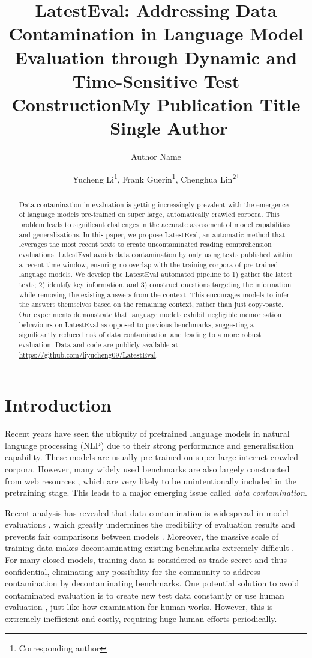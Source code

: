 \documentclass[letterpaper]{article} %
\title{LatestEval: Addressing Data Contamination in Language Model Evaluation through Dynamic and Time-Sensitive Test Construction}
\title{My Publication Title --- Single Author}
\author {
    Author Name
}
\author {
    Yucheng Li\textsuperscript{\rm 1},
    Frank Guerin\textsuperscript{\rm 1},
    Chenghua Lin\textsuperscript{\rm 2}\thanks{Corresponding author}
}
\begin{document}
\maketitle

\begin{abstract}
Data contamination in evaluation is getting increasingly prevalent with the emergence of language models pre-trained on super large, automatically crawled corpora. This problem leads to significant challenges in the accurate assessment of model capabilities and generalisations. In this paper, we propose LatestEval, an automatic method that leverages the most recent texts to create uncontaminated reading comprehension evaluations. LatestEval avoids data contamination by only using texts published within a recent time window, ensuring no overlap with the training corpora of pre-trained language models. We develop the LatestEval automated pipeline to 1) gather the latest texts; 2) identify key information, and 3) construct questions targeting the information while removing the existing answers from the context. This encourages models to infer the answers themselves based on the remaining context, rather than just copy-paste. Our experiments demonstrate that language models exhibit negligible memorisation behaviours on LatestEval as opposed to previous benchmarks, suggesting a significantly reduced risk of data contamination and leading to a more robust evaluation. Data and code are publicly available at: \url{https://github.com/liyucheng09/LatestEval}.
\end{abstract}

\section{Introduction}

Recent years have seen the ubiquity of pretrained language models in natural language processing (NLP) due to their strong performance and generalisation capability. These models are usually pre-trained on super large internet-crawled corpora. However, many widely used benchmarks are also largely constructed from web resources \cite{hendrycks2021measuring}, which are very likely to be unintentionally included in the pretraining stage. This leads to a major emerging issue called \textit{data contamination}.

Recent analysis has revealed that data contamination is widespread in model evaluations \cite{openai2023gpt4,anil2023palm}, which greatly undermines the credibility of evaluation results \cite{marie2023,narayanan_kapoor2023} and prevents fair comparisons between models \cite{dickson2023}. Moreover, the massive scale of training data makes decontaminating existing benchmarks extremely difficult \cite{kreutzer-etal-2022-quality}. For many closed models, training data is considered as trade secret and thus confidential, eliminating any possibility for the community to address contamination by decontaminating benchmarks.
One potential solution to avoid contaminated evaluation is to create new test data constantly or use human evaluation \cite{liu2023evaluating,jacovi2023stop}, just like how examination for human works. However, this is extremely inefficient and costly, requiring huge human efforts periodically.
\end{document}
